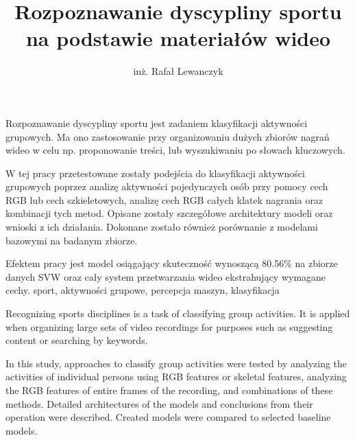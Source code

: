 \documentclass[
    left=2.5cm,         %
    right=2.5cm,        %
    top=2.5cm,          %
    bottom=3cm,         %
    bindingoffset=6mm,  %
    nohyphenation=false %
]{eiti/eiti-thesis}
\begin{document}
\MasterThesis %
{}
\title{
    Rozpoznawanie dyscypliny sportu na podstawie materiałów wideo
}
\author{inż. Rafał Lewanczyk}
\date{\the\year}
\maketitle

\cleardoublepage %
\streszczenie
Rozpoznawanie dyscypliny sportu jest zadaniem klasyfikacji aktywności grupowych. Ma ono zastosowanie przy organizowaniu dużych zbiorów nagrań wideo w celu np. proponowanie treści, lub wyszukiwaniu po słowach kluczowych. 

W tej pracy przetestowane zostały podejścia do klasyfikacji aktywności grupowych poprzez analizę aktywności pojedynczych osób przy pomocy cech RGB lub cech szkieletowych, analizę cech RGB całych klatek nagrania oraz kombinacji tych metod. Opisane zostały szczegółowe architektury modeli oraz wnioski z ich działania. Dokonane zostało również porównanie z modelami bazowymi na badanym zbiorze. 

Efektem pracy jest model osiągający skuteczność wynoszącą 80.56\% na zbiorze danych SVW \cite{svw} oraz cały system przetwarzania wideo ekstrahujący wymagane cechy. 
\slowakluczowe sport, aktywności grupowe, percepcja maszyn, klasyfikacja

\newpage
\abstract 
Recognizing sports disciplines is a task of classifying group activities. It is applied when organizing large sets of video recordings for purposes such as suggesting content or searching by keywords.

In this study, approaches to classify group activities were tested by analyzing the activities of individual persons using RGB features or skeletal features, analyzing the RGB features of entire frames of the recording, and combinations of these methods. Detailed architectures of the models and conclusions from their operation were described. Created models were compared to selected baseline models.
\end{document}

